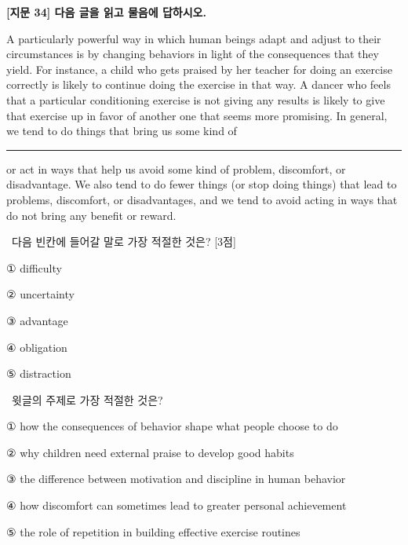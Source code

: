\documentclass[11pt,a4paper]{article}
\newcommand{\qno}[1]{\par\vspace{8pt}\noindent{\sffamily\bfseries #1.}\ }
\newcommand{\instr}[1]{{\sffamily #1}\par\vspace{3pt}}
\begin{document}
\begin{center}
{\fontsize{15}{17}\selectfont\sffamily\bfseries [지문 34] 다음 글을 읽고 물음에 답하시오.}
\end{center}
\vspace{4pt}

\begin{pbox}
\hspace{1em}A particularly powerful way in which human beings adapt and adjust to their circumstances is by changing behaviors in light of the consequences that they yield. For instance, a child who gets praised by her teacher for doing an exercise correctly is likely to continue doing the exercise in that way. A dancer who feels that a particular conditioning exercise is not giving any results is likely to give that exercise up in favor of another one that seems more promising. In general, we tend to do things that bring us some kind of \rule{2.5cm}{0.4pt} or act in ways that help us avoid some kind of problem, discomfort, or disadvantage. We also tend to do fewer things (or stop doing things) that lead to problems, discomfort, or disadvantages, and we tend to avoid acting in ways that do not bring any benefit or reward.
\end{pbox}

\qno{1}\instr{다음 빈칸에 들어갈 말로 가장 적절한 것은? [3점]}
\begin{choices}
\item ① difficulty
\item ② uncertainty
\item ③ advantage
\item ④ obligation
\item ⑤ distraction
\end{choices}

\qno{2}\instr{윗글의 주제로 가장 적절한 것은?}
\begin{choices}
\item ① how the consequences of behavior shape what people choose to do
\item ② why children need external praise to develop good habits
\item ③ the difference between motivation and discipline in human behavior
\item ④ how discomfort can sometimes lead to greater personal achievement
\item ⑤ the role of repetition in building effective exercise routines
\end{choices}
\end{document}
